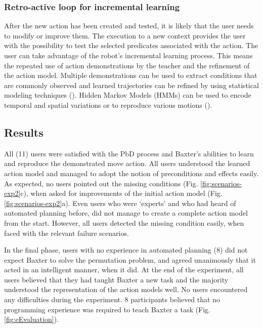 \subsubsection{Retro-active loop for incremental learning}
After the new action has been created and tested, it is likely that the user needs to modify or improve them.
The execution to a new context provides the user with the possibility to test the selected predicates associated with the action.
The user can take advantage of the robot's incremental learning process.
This means the repeated use of action demonstrations by the teacher and the refinement of the action model.
Multiple demonstrations can be used to extract conditions that are commonly observed and learned trajectories can be refined by using statistical modeling techniques (\cite{ude1993trajectory}).
Hidden Markov Models (HMMs) can be used to encode temporal and spatial variations or to reproduce various motions (\cite{tso1996hidden}).


\subsection{Results}
All (11) users were satisfied with the PbD process and Baxter's abilities to learn and reproduce the demonstrated move action. All users understood the learned action model and managed to adopt the notion of preconditions and effects easily. As expected, no users pointed out the missing conditions (Fig. \ref{fig:scenarios-exp2}c), when asked for improvements of the initial action model (Fig. \ref{fig:scenarios-exp2}a).
Even users who were `experts' and who had heard of automated planning before, did not manage to create a complete action model from the start. However, all users detected the missing condition easily, when faced with the relevant failure scenarios.

In the final phase, users with no experience in automated planning (8) did not expect Baxter to solve the permutation problem, and agreed unanimously that it acted in an intelligent manner, when it did. At the end of the experiment, all users believed that they had taught Baxter a new task and the majority understood the representation of the action models well. No users encountered any difficulties during the experiment. 8 participants believed that no programming experience was required to teach Baxter a task (Fig. \ref{fig:eEvaluation}).

